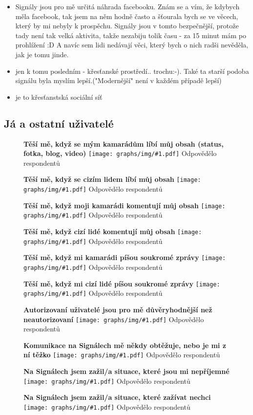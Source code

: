 \documentclass[12pt, a4paper, twoside]{article}
\newcommand{\answercount}[1]{Odpovědělo  respondentů}
\newcommand{\includegraph}[2]{
  \begin{figure}[H]
    \centering
    \textbf{#2}
    \texttt{[image: graphs/img/\#1.pdf]}
    \answercount{#1}
  \end{figure}
}
\begin{document}
\begin{itemize}
\item Signály jsou pro mě určitá náhrada facebooku. Znám se a vím, že kdybych měla facebook, tak jsem na něm hodně často a šťourala bych se ve věcech, který by mi nebyly k prospěchu. Signály jsou v tomto bezpečnější, protože tady není tak velká aktivita, takže nezabiju tolik času - za 15 minut mám po prohlížení :D A navíc sem lidi nedávají věci, který bych o nich radši nevěděla, jak je tomu jinde.

\item jen k tomu posledním - křesťanské prostředí..  trochu:-). Také ta starší podoba signálu byla myslím lepší.("Modernější" není v každém případě lepší)

\item je to křesťanstská sociální síť
\end{itemize}

\subsection{Já a ostatní uživatelé}\label{sec:ostatniuzivatele}

\includegraph{ostatni_tesi_me_libi_se_kamaradi}{Těší mě, když se mým kamarádům líbí můj obsah (status, fotka, blog, video)}

\includegraph{ostatni_tesi_me_libi_se_cizi}{Těší mě, když se cizím lidem líbí můj obsah}

\includegraph{ostatni_tesi_me_komentar_kamaradi}{Těší mě, když moji kamarádi komentují můj obsah}

\includegraph{ostatni_tesi_me_komentar_cizi}{Těší mě, když cizí lidé komentují můj obsah}

\includegraph{ostatni_tesi_me_zprava_kamaradi}{Těší mě, když mi kamarádi píšou soukromé zprávy}

\includegraph{ostatni_tesi_me_zprava_cizi}{Těší mě, když mi cizí lidé píšou soukromé zprávy}

\includegraph{ostatni_autorizovani_duveryhodnejsi}{Autorizovaní uživatelé jsou pro mě důvěryhodnější než neautorizovaní}

\includegraph{ostatni_neprijemne_komunikace_obtezuje}{Komunikace na Signálech mě někdy obtěžuje, nebo je mi z ní těžko}

\includegraph{ostatni_neprijemne_neprijemne_situace}{Na Signálech jsem zažil/a situace, které jsou mi nepříjemné}

\includegraph{ostatni_neprijemne_zazivat_nechci}{Na Signálech jsem zažil/a situace, které zažívat nechci}
\end{document}
